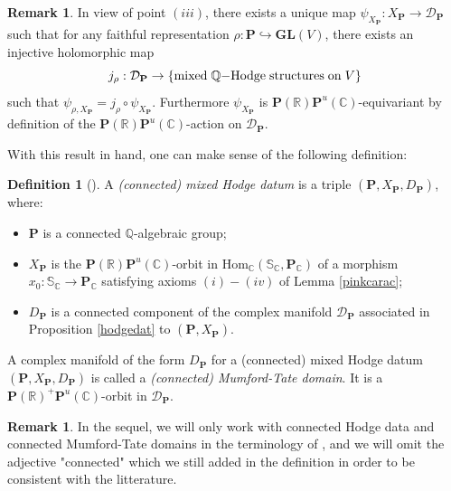 \documentclass[10pt]{article}
\numberwithin{equation}{subsection}
\theoremstyle{plain}
\newtheorem{lemma}[theorem]{Lemma}
\theoremstyle{definition}
\newtheorem{definition}[theorem]{Definition}
\newtheorem{remark}[theorem]{Remark}
\theoremstyle{remark}
\newcommand{\lie}{\mathrm{Lie}}
\newcommand{\Q}{\mathbb Q}
\newcommand{\C}{\mathbb C}
\newcommand{\R}{\mathbb R}
\newcommand{\s}{\mathbb S}
\newcommand{\pp}{\mathbf P}
\newcommand{\bul}{\bullet}
\newcommand{\Hom}{\mathrm{Hom}}
\newcommand{\gl}{\mathbf{GL}}
\begin{document}
\begin{remark}
In view of point $(iii)$, there exists a unique map $\psi_{X_\pp} : X_\pp \rightarrow \mathcal{D}_\pp$ such that for any faithful representation $\rho : \pp \hookrightarrow \gl(V)$, there exists an injective holomorphic map \[j_\rho : \mathcal{D}_\pp \rightarrow \{\mathrm{mixed} \hspace{0.1cm} \Q\mathrm{-Hodge} \hspace{0.1cm} \mathrm{structures} \hspace{0.1cm} \mathrm{on} \hspace{0.1cm} V\}\] such that $\psi_{\rho,X_\pp} = j_\rho \circ \psi_{X_\pp}$. Furthermore $\psi_{X_\pp}$ is $\pp(\R)\pp^u(\C)$-equivariant by definition of the $\pp(\R)\pp^u(\C)$-action on $\mathcal{D}_\pp$.
\end{remark}
With this result in hand, one can make sense of the following definition:
\begin{definition}[{\cite[Def. 3.4]{klingler_atyp}}]
A \textit{(connected) mixed Hodge datum} is a triple $(\pp, X_\pp, D_\pp)$, where:
\begin{itemize}
\item[(a)] $\pp$ is a connected $\Q$-algebraic group;
\item[(b)] $X_\pp$ is the $\pp(\R)\pp^u(\C)$-orbit in $\Hom_\C(\s_\C, \pp_\C)$ of a morphism $x_0 : \s_\C \rightarrow \pp_\C$ satisfying axioms $(i)-(iv)$ of Lemma \ref{pinkcarac};
\item[(c)] $D_\pp$ is a connected component of the complex manifold $\mathcal{D}_\pp$ associated in Proposition \ref{hodgedat} to $(\pp,X_\pp)$.
\end{itemize}
A complex manifold of the form $D_\pp$ for a (connected) mixed Hodge datum $(\pp, X_\pp, D_\pp)$ is called a \textit{(connected) Mumford-Tate domain}. It is a $\pp(\R)^+\pp^u(\C)$-orbit in $\mathcal{D}_\pp$.
\end{definition}
\begin{remark}
In the sequel, we will only work with connected Hodge data and connected Mumford-Tate domains in the terminology of \cite{klingler_atyp}, and we will omit the adjective "connected" which we still added in the definition in order to be consistent with the litterature.
\end{remark}
\end{document}
